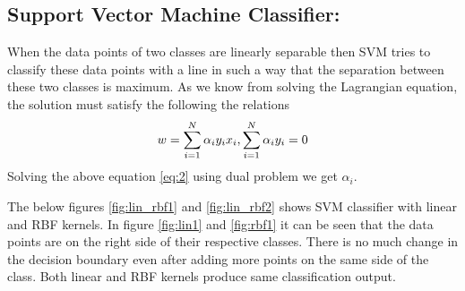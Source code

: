 \documentclass[12pt]{report}
\begin{document}
{	  \subsection{Support Vector Machine Classifier:}	
	  When the data points of two classes are linearly separable then SVM tries to classify these data points with a line in such a way that the separation between these two classes is maximum.
	  As we know from solving the Lagrangian equation, the solution must satisfy the following the relations
	  \begin{equation}\label{eq:2}
	  \centering
	  w = \sum_{i=1}^{N} \alpha_i y_i x_i , \sum_{i=1}^{N} \alpha_i y_i = 0
	  \end{equation}
	  Solving the above equation \ref{eq:2} using dual problem we get $\alpha_i$.

	   The below figures \ref{fig:lin_rbf1} and \ref{fig:lin_rbf2} shows SVM classifier with linear and RBF kernels. In figure \ref{fig:lin1} and \ref{fig:rbf1} it can be seen that the data points are on the right side of their respective classes. There is no much change in the decision boundary even after adding more points on the same side of the class. Both linear and RBF kernels produce same classification output.
	   

}
\end{document}
